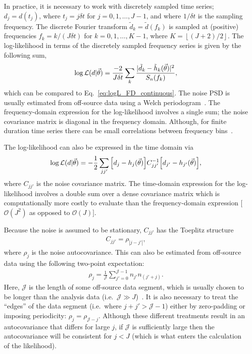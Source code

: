 In practice, it is necessary to work with discretely sampled time series; $d_j = d(t_j)$, where $t_j=j\delta t$ for $j=0,1,\ldots, J-1$, and where $1/\delta t$ is the sampling frequency.
The discrete Fourier transform $\tilde{d}_k = \tilde{d}(f_k)$ is sampled at (positive) frequencies $f_k=k/(J\delta t)$ for $k=0,1,\ldots,K-1$, where $K=\left \lfloor (J+2)/2\right \rfloor$.
The log-likelihood in terms of the discretely sampled frequency series is given by the following sum,
\begin{align} \label{eq:logL_FD_discrete}
	\log\mathcal{L}(d|\vec{\theta}) = \frac{-2}{J\delta t}\sum_{k}\frac{|\tilde{d}_k-\tilde{h}_k(\vec{\theta})|^2}{S_n(f_k)},
\end{align}
which can be compared to Eq.~\ref{eq:logL_FD_continuous}.
The noise PSD is usually estimated from off-source data using a Welch periodogram~\cite{1161901}.
The frequency-domain expression for the log-likelihood involves a single sum; the noise covariance matrix is diagonal in the frequency domain.
Although, for finite duration time series there can be small correlations between frequency bins~\cite{Talbot:2021igi}.

The log-likelihood can also be expressed in the time domain via
\begin{align} \label{eq:logL_TD_discrete}
	\log\mathcal{L}(d|\vec{\theta}) = -\frac{1}{2}\sum_{jj'}\qty[d_j-h_j(\vec{\theta})] C^{-1}_{jj'} \qty[d_{j'}-h_{j'}(\vec{\theta})],
\end{align}
where $C_{jj'}$ is the noise covariance matrix.
The time-domain expression for the log-likelihood involves a double sum over a dense covariance matrix which is computationally more costly to evaluate than the frequency-domain expression [$\mathcal{O}(J^2)$ as opposed to $\mathcal{O}(J)$].

Because the noise is assumed to be stationary, $C_{jj'}$ has the Toeplitz structure
\begin{align} \label{eq:Toeplitz}
	C_{jj'} = \rho_{|j-j'|},
\end{align} 
where $\rho_j$ is the noise autocovariance. 
This can also be estimated from off-source data using the following two-point expectation:
\begin{align} \label{eq:autocovariance}
	\rho_j = \frac{1}{\mathcal{J}}\sum_{j'=0}^{\mathcal{J}-1}n_{j'}n_{(j'+j)}.
\end{align}
Here, $\mathcal{J}$ is the length of some off-source data segment, which is usually chosen to be longer than the analysis data (i.e.\ $\mathcal{J} \gg J$)~\cite{Isi:2021iql}.
It is also necessary to treat the ``edges'' of the data segment (i.e.\ where $j + j' > \mathcal{J}-1$) either by zero-padding or imposing periodicity: $\rho_j = \rho_{\mathcal{J}-j}$.
Although these different treatments result in an autocovariance that differs for large $j$, if $\mathcal{J}$ is sufficiently large then the autocovariance will be consistent for $j < J$ (which is what enters the calculation of the likelihood).

